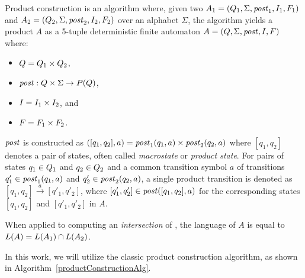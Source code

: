 \begin{definition} \hfill \newline
Product construction is an algorithm where, given two \nfas $A_1 = (Q_1, \Sigma, \mathit{post}_1, I_1, F_1)$ and $A_2 = (Q_2, \Sigma, \mathit{post}_2, I_2, F_2)$ over an alphabet $\Sigma$, the algorithm yields a product \nfa $A$ as a 5-tuple deterministic finite automaton $A = (Q, \Sigma, \mathit{post}, I, F)$ where:
\begin{itemize}
    \item $Q = Q_1 \times Q_2$,
    \item $\mathit{post}: Q \times \Sigma \rightarrow{} P(Q)$,
    \item $I = I_1 \times I_2$, and
    \item $F = F_1 \times F_2$.
\end{itemize}
\end{definition}

$\mathit{post}$ is constructed as $([q_1, q_2], a) = \mathit{post}_1(q_1, a) \times \mathit{post}_2(q_2, a)$ where $[q_1, q_2]$ denotes a pair of states, often called \emph{macrostate} or \emph{product state}. For pairs of states $q_1 \in Q_1$ and $q_2 \in Q_2$ and a common transition symbol $a$ of transitions $q'_1 \in \mathit{post}_1(q_1, a)$ and $q'_2 \in \mathit{post}_2(q_2,a)$, a single product transition is denoted as $[q_1, q_2] \xrightarrow{a} [q'_1, q'_2]$, where $[q'_1, q'_2] \in \mathit{post}([q_1, q_2], a)$ for the corresponding states $[q_1, q_2]$ and $[q'_1, q'_2]$ in $A$.

When applied to computing an \emph{intersection} of \nfas, the language of $A$ is equal to $ L(A) = L(A_1) \cap L(A_2) $.

In this work, we will utilize the classic product construction algorithm, as shown in Algorithm~\ref{productConstructionAlg}.

